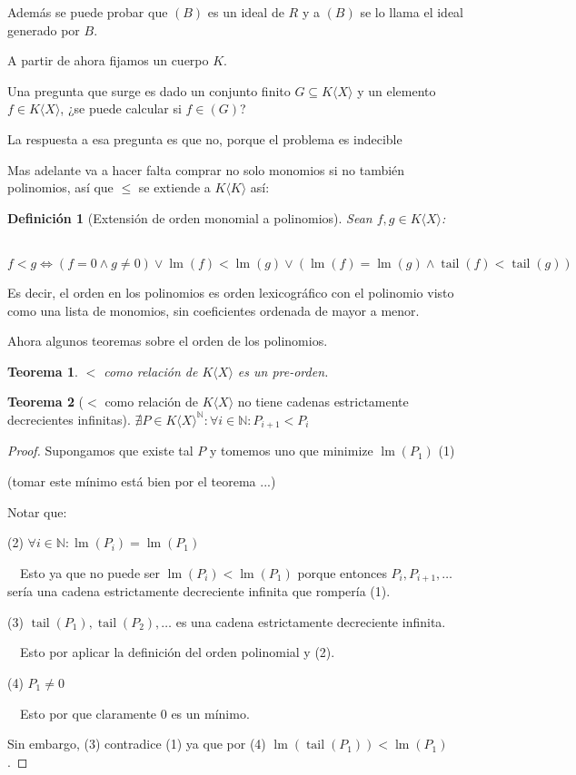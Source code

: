 \documentclass{amsbook}
\theoremstyle{customstyle}
\newtheorem{definition}{Definición}[section]
\newtheorem{theorem}{Teorema}[section]
\DeclareMathOperator{\lm}{lm}
\DeclareMathOperator{\tail}{tail}
\begin{document}
Además se puede probar que $(B)$ es un ideal de $R$ y a $(B)$ se lo llama el ideal generado por $B$.

A partir de ahora fijamos un cuerpo $K$.

Una pregunta que surge es dado un conjunto finito $G ⊆ K⟨X⟩$ y un elemento $f ∈ K⟨X⟩$, ¿se puede calcular si $f ∈ (G)$?

La respuesta a esa pregunta es que no, porque el problema es indecible


Mas adelante va a hacer falta comprar no solo monomios si no también polinomios, así que $≤$ se extiende a $K⟨K⟩$ así:

\begin{definition}[Extensión de orden monomial a polinomios]
Sean $f, g ∈  K⟨X⟩$:

  $f < g ⇔ (f = 0 ∧ g ≠ 0) ∨ \lm(f) < \lm(g) ∨ (\lm(f) = \lm(g) ∧ \tail(f) < \tail(g))$

\end{definition}
Es decir, el orden en los polinomios es orden lexicográfico con el polinomio visto como una lista de monomios, sin coeficientes ordenada de mayor a menor.

Ahora algunos teoremas sobre el orden de los polinomios.

\begin{theorem}
$<$ como relación de $K⟨X⟩$ es un pre-orden.
\end{theorem}

\begin{theorem}[$<$ como relación de $K⟨X⟩$ no tiene cadenas estrictamente decrecientes infinitas]\label{thm:le_en_KX_no_tiene_cadenas_estrictamente_decrecientes_infinitas}
  $∄P ∈ K⟨X⟩^ℕ : ∀i ∈ ℕ : P_{i + 1} < P_i$
\end{theorem}
\begin{proof}
Supongamos que existe tal $P$ y tomemos uno que minimize $\lm(P_1)$ (1)

(tomar este mínimo está bien por el teorema ...) %

Notar que:

(2) $∀i ∈ ℕ : \lm(P_i) = \lm(P_1)$

  Esto ya que no puede ser $\lm(P_i) < \lm(P_1)$ porque entonces $P_i, P_{i + 1}, …$ sería una cadena estrictamente decreciente infinita que rompería (1).


(3) $\tail(P_1), \tail(P_2), …$ es una cadena estrictamente decreciente infinita.

  Esto por aplicar la definición del orden polinomial y (2).

(4) $P_1 ≠ 0$

  Esto por que claramente $0$ es un mínimo.

Sin embargo, (3) contradice (1) ya que por (4) $\lm(\tail(P_1)) < \lm(P_1)$.

\end{proof}
\end{document}

